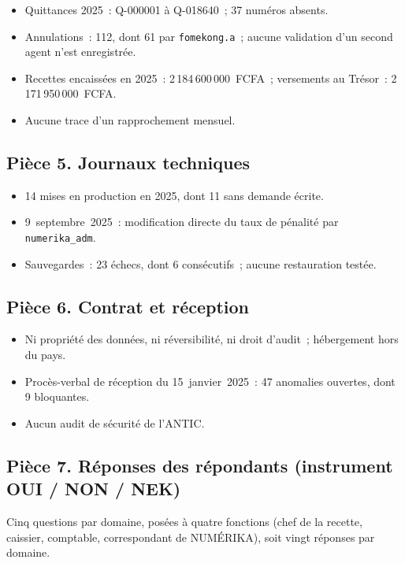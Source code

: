 \begin{itemize}
    \item Quittances 2025~: Q-000001 à Q-018640~; 37 numéros absents.
    \item Annulations~: 112, dont 61 par \texttt{fomekong.a}~; aucune
          validation d'un second agent n'est enregistrée.
    \item Recettes encaissées en 2025~: 2\,184\,600\,000~FCFA~; versements
          au Trésor~: 2\,171\,950\,000~FCFA.
    \item Aucune trace d'un rapprochement mensuel.
\end{itemize}

\subsection*{Pièce 5. Journaux techniques}

\begin{itemize}
    \item 14 mises en production en 2025, dont 11 sans demande écrite.
    \item 9~septembre~2025~: modification directe du taux de pénalité par
          \texttt{numerika\_adm}.
    \item Sauvegardes~: 23 échecs, dont 6 consécutifs~; aucune
          restauration testée.
\end{itemize}

\subsection*{Pièce 6. Contrat et réception}

\begin{itemize}
    \item Ni propriété des données, ni réversibilité, ni droit d'audit~;
          hébergement hors du pays.
    \item Procès-verbal de réception du 15~janvier~2025~: 47 anomalies
          ouvertes, dont 9 bloquantes.
    \item Aucun audit de sécurité de l'ANTIC.
\end{itemize}

\subsection*{Pièce 7. Réponses des répondants (instrument OUI / NON / NEK)}

Cinq questions par domaine, posées à quatre fonctions (chef de la recette,
caissier, comptable, correspondant de NUMÉRIKA), soit vingt réponses par
domaine.

